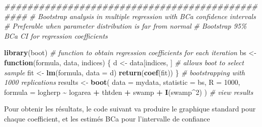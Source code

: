 \documentclass[
  12pt,
]{book}
\newenvironment{Shaded}{\begin{snugshade}}{\end{snugshade}}
\newcommand{\CommentTok}[1]{\textcolor[rgb]{0.56,0.35,0.01}{\textit{#1}}}
\newcommand{\ControlFlowTok}[1]{\textcolor[rgb]{0.13,0.29,0.53}{\textbf{#1}}}
\newcommand{\DataTypeTok}[1]{\textcolor[rgb]{0.13,0.29,0.53}{#1}}
\newcommand{\DecValTok}[1]{\textcolor[rgb]{0.00,0.00,0.81}{#1}}
\newcommand{\KeywordTok}[1]{\textcolor[rgb]{0.13,0.29,0.53}{\textbf{#1}}}
\newcommand{\NormalTok}[1]{#1}
\newcommand{\OperatorTok}[1]{\textcolor[rgb]{0.81,0.36,0.00}{\textbf{#1}}}
\newcommand{\StringTok}[1]{\textcolor[rgb]{0.31,0.60,0.02}{#1}}
\begin{document}
\begin{Shaded}
\begin{Highlighting}[]
\CommentTok{\#\#\#\#\#\#\#\#\#\#\#\#\#\#\#\#\#\#\#\#\#\#\#\#\#\#\#\#\#\#\#\#\#\#\#\#\#\#\#\#\#\#\#\#\#\#\#\#}
\CommentTok{\# Bootstrap analysis in multiple regression with BCa confidence intervals}
\CommentTok{\# Preferable when parameter distribution is far from normal}
\CommentTok{\# Bootstrap 95\% BCa CI for regression coefficients}

\KeywordTok{library}\NormalTok{(boot)}
\CommentTok{\# function to obtain regression coefficients for each iteration}
\NormalTok{bs \textless{}{-}}\StringTok{ }\ControlFlowTok{function}\NormalTok{(formula, data, indices) \{}
\NormalTok{  d \textless{}{-}}\StringTok{ }\NormalTok{data[indices, ] }\CommentTok{\# allows boot to select sample}
\NormalTok{  fit \textless{}{-}}\StringTok{ }\KeywordTok{lm}\NormalTok{(formula, }\DataTypeTok{data =}\NormalTok{ d)}
  \KeywordTok{return}\NormalTok{(}\KeywordTok{coef}\NormalTok{(fit))}
\NormalTok{\}}
\CommentTok{\# bootstrapping with 1000 replications}
\NormalTok{results \textless{}{-}}\StringTok{ }\KeywordTok{boot}\NormalTok{(}
  \DataTypeTok{data =}\NormalTok{ mydata, }\DataTypeTok{statistic =}\NormalTok{ bs, }\DataTypeTok{R =} \DecValTok{1000}\NormalTok{,}
  \DataTypeTok{formula =}\NormalTok{ logherp }\OperatorTok{\textasciitilde{}}\StringTok{ }\NormalTok{logarea }\OperatorTok{+}\StringTok{ }\NormalTok{thtden }\OperatorTok{+}\StringTok{ }\NormalTok{swamp }\OperatorTok{+}\StringTok{ }\KeywordTok{I}\NormalTok{(swamp}\OperatorTok{\^{}}\DecValTok{2}\NormalTok{)}
\NormalTok{)}
\CommentTok{\# view results}
\end{Highlighting}
\end{Shaded}

Pour obtenir les résultats, le code suivant va produire le graphique standard pour chaque coefficient, et les estimés BCa pour l'intervalle de confiance
\end{document}
